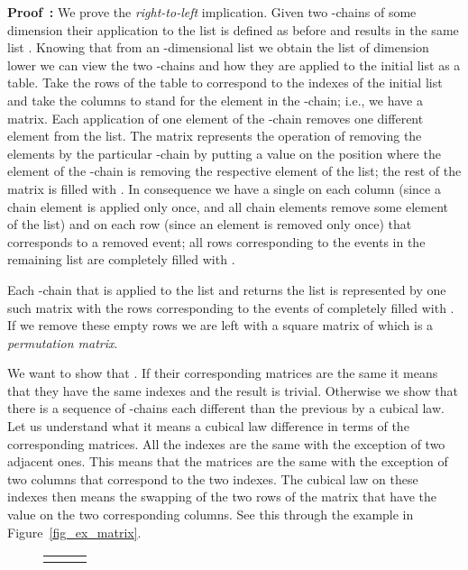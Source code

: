 \documentclass[submission,copyright,creativecommons]{eptcs}
\newenvironment{proof}[1][\!\!\,]{\vspace{1ex}\noindent\textbf{Proof #1: }}{\hfill\vspace{2ex}}
\begin{document}
\begin{proof}
We prove the \textit{right-to-left} implication.
Given two -chains of some dimension  their application to the list  is defined as before and results in the same list . Knowing that from an -dimensional list  we obtain the list  of dimension  lower we can view the two -chains and how they are applied to the initial list as a table. Take the rows of the table to correspond to the indexes of the initial list  and take the columns to stand for the element in the -chain; i.e., we have a  matrix. Each application of one element of the -chain removes one different element from the list. The matrix represents the operation of removing the elements by the particular -chain by putting a  value on the position where the element of the -chain is removing the respective element of the list; the rest of the matrix is filled with . In consequence we have a single   on each column (since a chain element is applied only once, and all chain elements remove some element of the list) and on each row (since an element is removed only once) that corresponds to a removed event; all rows corresponding to the events in the remaining list  are completely filled with . 

Each -chain that is applied to the list  and returns the list  is represented by one such matrix with the rows corresponding to the events of  completely filled with . If we remove these empty rows we are left with a square matrix of  which is a \textit{permutation matrix}.

We want to show that . If their corresponding matrices are the same it means that they have the same indexes and the result is trivial.
Otherwise we show that there is a sequence of -chains each different than the previous by a cubical law. Let us understand what it means a cubical law difference in terms of the corresponding matrices. All the indexes are the same with the exception of two adjacent ones. This means that the matrices are the same with the exception of two columns that correspond to the two indexes. The cubical law on these indexes then means the swapping of the two rows of the matrix that have the value  on the two corresponding columns.
See this through the example in Figure~\ref{fig_ex_matrix}.



\begin{figure}[tp]
\begin{tabular}{lll}

&

&
\\
\end{tabular} 


\end{figure}
\end{proof}
\end{document}
